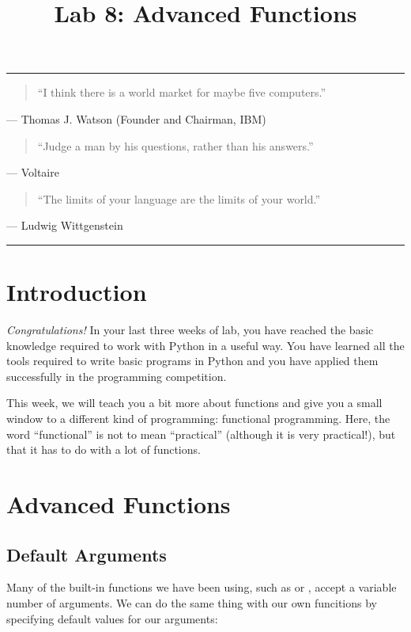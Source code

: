 \documentclass[11pt]{cselabheader}
\title{Lab 8: Advanced Functions}
\begin{document}
\maketitle

\hrule
\begin{quotation}
``I think there is a world market for maybe five computers.''
\end{quotation}
\begin{flushright}
--- Thomas J. Watson (Founder and Chairman, IBM)
\end{flushright}

\begin{quotation}
``Judge a man by his questions, rather than his answers.''
\end{quotation}
\begin{flushright}
--- Voltaire
\end{flushright}

\begin{quotation}
``The limits of your language are the limits of your world.''
\end{quotation}
\begin{flushright}
--- Ludwig Wittgenstein
\end{flushright}

\hrule

\section{Introduction}
\emph{Congratulations!} In your last three weeks of lab, you have reached the
basic knowledge required to work with Python in a useful way. You have learned
all the tools required to write basic programs in Python and you have applied
them successfully in the programming competition.

This week, we will teach you a bit more about functions and give you a small
window to a different kind of programming: functional programming. Here, the
word ``functional'' is not to mean ``practical'' (although it is very
practical!), but that it has to do with a lot of functions.

\pagebreak
\section{Advanced Functions}
\label{sec:advfun}

\subsection{Default Arguments}
\label{subsec:arg}
Many of the built-in functions we have been using, such as  or
, accept a variable number of arguments. We can do the same
thing with our own funcitions by specifying default values for our arguments:
\end{document}
